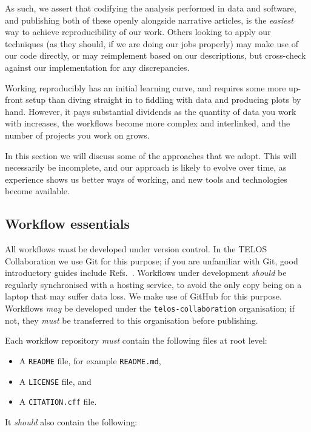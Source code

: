 \documentclass{article}
\newcommand\rfcword[1]{\emph{#1}\xspace}
\newcommand\must{\rfcword{must}}
\newcommand\should{\rfcword{should}}
\newcommand\may{\rfcword{may}}
\newcommand\filename[1]{\texttt{#1}\xspace}
\newcommand\readme{\filename{README}}
\begin{document}
As such,
we assert that codifying the analysis performed in data and software,
and publishing both of these openly alongside narrative articles,
is the \emph{easiest} way to achieve reproducibility of our work.
Others looking to apply our techniques
(as they should,
if we are doing our jobs properly)
may make use of our code directly,
or may reimplement based on our descriptions,
but cross-check against our implementation for any discrepancies.

Working reproducibly has an initial learning curve,
and requires some more up-front setup than diving straight in to
fiddling with data and producing plots by hand.
However,
it pays substantial dividends as the quantity of data you work with increases,
the workflows become more complex and interlinked,
and the number of projects you work on grows.

In this section we will discuss some of the approaches that we adopt.
This will necessarily be incomplete,
and our approach is likely to evolve over time,
as experience shows us better ways of working,
and new tools and technologies become available.

\subsection{Workflow essentials}
\label{sec:wf-essentials}

All workflows \must be developed under version control.
In the TELOS Collaboration we use Git for this purpose;
if you are unfamiliar with Git,
good introductory guides include Refs.~\cite{swc-git,chacon2014pro}.
Workflows under development \should be regularly synchronised with a hosting service,
to avoid the only copy being on a laptop that may suffer data loss.
We make use of GitHub for this purpose.
Workflows \may be developed under the \texttt{telos-collaboration} organisation;
if not,
they \must be transferred to this organisation before publishing.

Each workflow repository \must contain the following files at root level:

\begin{itemize}
  \item A \readme file, for example \filename{README.md},
  \item A \filename{LICENSE} file, and
  \item A \filename{CITATION.cff} file.
\end{itemize}

It \should also contain the following:
\end{document}
